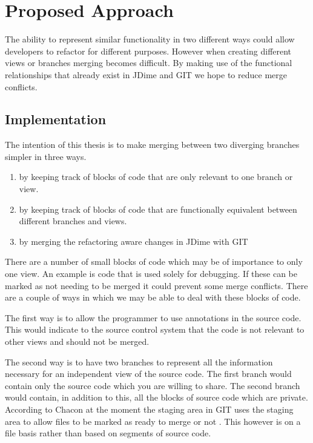 \documentclass[12pt]{CRPITStyle}
\renewcommand{\cite}{\citep}
\begin{document}
\section{Proposed Approach}
The ability to represent similar functionality in two different ways could allow developers to refactor for different purposes. However when creating different views or branches merging becomes difficult. By making use of the functional relationships that already exist in JDime and GIT we hope to reduce merge conflicts.  

\subsection{Implementation}

The intention of this thesis is to make merging between two diverging branches simpler in three ways. 

\begin{enumerate}

 \item by keeping track of blocks of code that are only relevant to one branch or view.
 \item by keeping track of blocks of code that are functionally equivalent between different branches and views.
 \item by merging the refactoring aware changes in JDime with GIT

\end{enumerate}

There are a number of small blocks of code which may be of importance to only one view.  An example is code that is used solely for debugging. If these can be marked as not needing to be merged it could prevent some merge conflicts. There are a couple of ways in which we may be able to deal with these blocks of code.

The first way is to allow the programmer to use annotations in the source code. This would indicate to the source control system that the code is not relevant to other views and should not be merged.

The second way is to have two branches to represent all the information necessary for an independent view of the source code.  The first branch would contain only the source code which you are willing to share. The second branch would contain, in addition to this, all the blocks of source code which are private.  According to Chacon at the moment the staging area in GIT uses the staging area to allow files to be marked as ready to merge or not \cite{Chacon2009}. This however is on a file basis rather than based on segments of source code.
\end{document}

